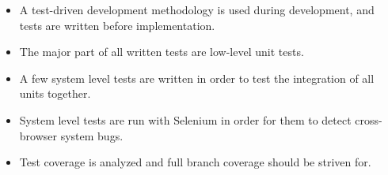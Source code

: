 
\begin{itemize}
    \item A test-driven development methodology is used during
          development, and tests are written before implementation.
    \item The major part of all written tests are low-level unit tests.
    \item A few system level tests are written in order to test the
          integration of all units together.
    \item System level tests are run with Selenium in order for them
          to detect cross-browser system bugs.
    \item Test coverage is analyzed and full branch coverage should be
          striven for.
\end{itemize}
